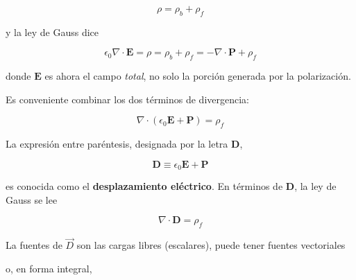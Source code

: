\documentclass[12pt,a4paper]{report}
\newcommand{\esp}{\vspace{0.5cm}}
\begin{document}
	\esp
	
	\begin{equation}
		\rho = \rho_b + \rho_f
	\end{equation}
	
	\esp
	
	\noindent y la ley de Gauss dice
	
	\esp
	
	\begin{equation}
		\epsilon_0 \nabla \cdot \mathbf{E} = \rho = \rho_b + \rho_f = -\nabla \cdot \mathbf{P} + \rho_f
	\end{equation}
	
	\esp
	
	\noindent donde $\mathbf{E}$ es ahora el campo \textit{total}, no solo la porción generada por la polarización.
	
	\esp
	
	\noindent Es conveniente combinar los dos términos de divergencia:
	
	\esp
	
	\begin{equation}
		\nabla \cdot (\epsilon_0 \mathbf{E} + \mathbf{P}) = \rho_f
	\end{equation}
	
	\esp
	
	\noindent La expresión entre paréntesis, designada por la letra \textbf{D},
	
	\esp
	
	\begin{equation}
		\mathbf{D} \equiv \epsilon_0 \mathbf{E} + \mathbf{P}
	\end{equation}
	
	\esp
	
	\noindent es conocida como el \textbf{desplazamiento eléctrico}. En términos de \textbf{D}, la ley de Gauss se lee
	
	\esp
	
	\begin{equation}
		\nabla \cdot \mathbf{D} = \rho_f
	\end{equation}
	
	\esp
	
	\begin{nota}
		La fuentes de $\vec{D}$ son las cargas libres (escalares), puede tener fuentes vectoriales
	\end{nota}
	
	\esp
	
	\noindent o, en forma integral,
	
	\esp
	
\end{document}

